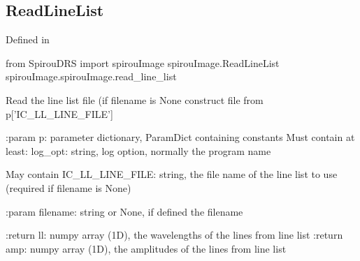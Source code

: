 \noindent\begin{minipage}{\textwidth}
\subsection{ReadLineList}

Defined in \spirouImage{}

\begin{pythonbox}
from SpirouDRS import spirouImage
spirouImage.ReadLineList
spirouImage.spirouImage.read_line_list
\end{pythonbox}

\begin{pythondocstring}
Read the line list file (if filename is None construct file from
p['IC_LL_LINE_FILE']

:param p: parameter dictionary, ParamDict containing constants
    Must contain at least:
        log_opt: string, log option, normally the program name

    May contain
        IC_LL_LINE_FILE: string, the file name of the line list to use
                         (required if filename is None)

:param filename: string or None, if defined the filename

:return ll: numpy array (1D), the wavelengths of the lines from line list
:return amp: numpy array (1D), the amplitudes of the lines from line list
\end{pythondocstring}
\end{minipage}



